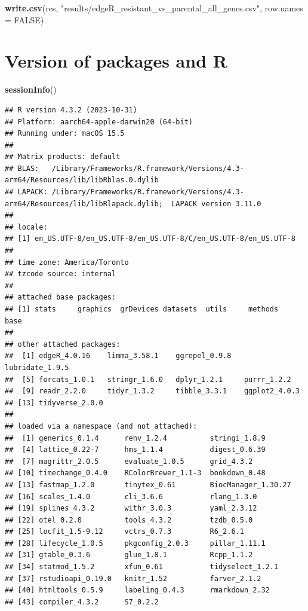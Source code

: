 \documentclass[
]{book}
\newenvironment{Shaded}{\begin{snugshade}}{\end{snugshade}}
\newcommand{\AttributeTok}[1]{\textcolor[rgb]{0.13,0.29,0.53}{#1}}
\newcommand{\ConstantTok}[1]{\textcolor[rgb]{0.56,0.35,0.01}{#1}}
\newcommand{\FunctionTok}[1]{\textcolor[rgb]{0.13,0.29,0.53}{\textbf{#1}}}
\newcommand{\NormalTok}[1]{#1}
\newcommand{\StringTok}[1]{\textcolor[rgb]{0.31,0.60,0.02}{#1}}
\begin{document}
\begin{Shaded}
\begin{Highlighting}[]
\FunctionTok{write.csv}\NormalTok{(res, }\StringTok{"results/edgeR\_resistant\_vs\_parental\_all\_genes.csv"}\NormalTok{, }\AttributeTok{row.names =} \ConstantTok{FALSE}\NormalTok{)}
\end{Highlighting}
\end{Shaded}

\section{Version of packages and R}\label{version-of-packages-and-r}

\begin{Shaded}
\begin{Highlighting}[]
\FunctionTok{sessionInfo}\NormalTok{()}
\end{Highlighting}
\end{Shaded}

\begin{verbatim}
## R version 4.3.2 (2023-10-31)
## Platform: aarch64-apple-darwin20 (64-bit)
## Running under: macOS 15.5
## 
## Matrix products: default
## BLAS:   /Library/Frameworks/R.framework/Versions/4.3-arm64/Resources/lib/libRblas.0.dylib 
## LAPACK: /Library/Frameworks/R.framework/Versions/4.3-arm64/Resources/lib/libRlapack.dylib;  LAPACK version 3.11.0
## 
## locale:
## [1] en_US.UTF-8/en_US.UTF-8/en_US.UTF-8/C/en_US.UTF-8/en_US.UTF-8
## 
## time zone: America/Toronto
## tzcode source: internal
## 
## attached base packages:
## [1] stats     graphics  grDevices datasets  utils     methods   base     
## 
## other attached packages:
##  [1] edgeR_4.0.16    limma_3.58.1    ggrepel_0.9.8   lubridate_1.9.5
##  [5] forcats_1.0.1   stringr_1.6.0   dplyr_1.2.1     purrr_1.2.2    
##  [9] readr_2.2.0     tidyr_1.3.2     tibble_3.3.1    ggplot2_4.0.3  
## [13] tidyverse_2.0.0
## 
## loaded via a namespace (and not attached):
##  [1] generics_0.1.4      renv_1.2.4          stringi_1.8.9      
##  [4] lattice_0.22-7      hms_1.1.4           digest_0.6.39      
##  [7] magrittr_2.0.5      evaluate_1.0.5      grid_4.3.2         
## [10] timechange_0.4.0    RColorBrewer_1.1-3  bookdown_0.48      
## [13] fastmap_1.2.0       tinytex_0.61        BiocManager_1.30.27
## [16] scales_1.4.0        cli_3.6.6           rlang_1.3.0        
## [19] splines_4.3.2       withr_3.0.3         yaml_2.3.12        
## [22] otel_0.2.0          tools_4.3.2         tzdb_0.5.0         
## [25] locfit_1.5-9.12     vctrs_0.7.3         R6_2.6.1           
## [28] lifecycle_1.0.5     pkgconfig_2.0.3     pillar_1.11.1      
## [31] gtable_0.3.6        glue_1.8.1          Rcpp_1.1.2         
## [34] statmod_1.5.2       xfun_0.61           tidyselect_1.2.1   
## [37] rstudioapi_0.19.0   knitr_1.52          farver_2.1.2       
## [40] htmltools_0.5.9     labeling_0.4.3      rmarkdown_2.32     
## [43] compiler_4.3.2      S7_0.2.2
\end{verbatim}
\end{document}
